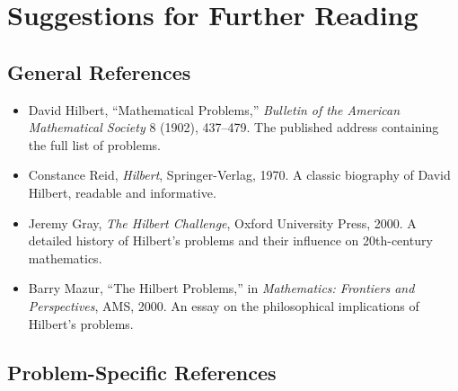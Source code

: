 
\chapter*{Suggestions for Further Reading}

\section*{General References}

\begin{itemize}
    \item David Hilbert, ``Mathematical Problems,'' \textit{Bulletin of the American Mathematical Society} 8 (1902), 437--479. The published address containing the full list of problems.
    \item Constance Reid, \textit{Hilbert}, Springer-Verlag, 1970. A classic biography of David Hilbert, readable and informative.

    \item Jeremy Gray, \textit{The Hilbert Challenge}, Oxford University Press, 2000. A detailed history of Hilbert's problems and their influence on 20th-century mathematics.

    \item Barry Mazur, ``The Hilbert Problems,'' in \textit{Mathematics: Frontiers and Perspectives}, AMS, 2000. An essay on the philosophical implications of Hilbert's problems.
\end{itemize}

\section*{Problem-Specific References}

